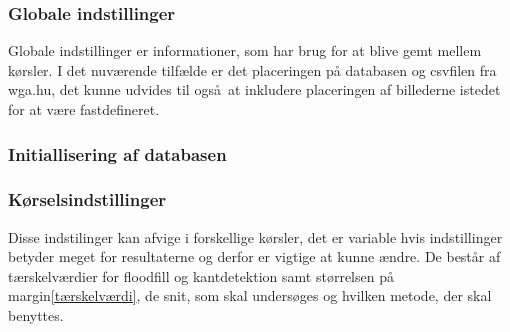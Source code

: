 {\subsubsection{Globale indstillinger}
Globale indstillinger er informationer, som har brug for at blive gemt
mellem kørsler. I det nuværende tilfælde er det placeringen på databasen og
csvfilen fra wga.hu, det kunne udvides til også at inkludere placeringen
af billederne istedet for at være fastdefineret.
\subsubsection{Initiallisering af databasen}

\subsubsection{Kørselsindstillinger}
Disse indstilinger kan afvige i forskellige kørsler, det er variable
hvis indstillinger betyder meget for resultaterne og derfor er vigtige
at kunne ændre. De består af tærskelværdier for floodfill og
kantdetektion samt størrelsen på margin\ref{tærskelværdi}, de snit, som
skal undersøges og hvilken metode, der skal benyttes.
}
